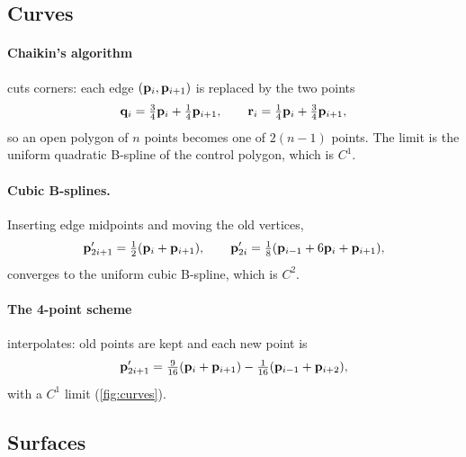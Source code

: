 \subsection{Curves}

\paragraph{Chaikin's algorithm} \citep{Chaikin1974} cuts corners: each edge $(\mathbf{p}_i,\mathbf{p}_{i+1})$ is
replaced by the two points
\begin{equation}
\mathbf{q}_i=\tfrac34\mathbf{p}_i+\tfrac14\mathbf{p}_{i+1},\qquad \mathbf{r}_i=\tfrac14\mathbf{p}_i+\tfrac34\mathbf{p}_{i+1},
\end{equation}
so an open polygon of $n$ points becomes one of $2(n-1)$ points. The limit is the uniform quadratic
B-spline of the control polygon, which is $C^1$.

\paragraph{Cubic B-splines.} Inserting edge midpoints and moving the old vertices,
\begin{equation}
\mathbf{p}'_{2i+1}=\tfrac12(\mathbf{p}_i+\mathbf{p}_{i+1}),\qquad \mathbf{p}'_{2i}=\tfrac18(\mathbf{p}_{i-1}+6\mathbf{p}_i+\mathbf{p}_{i+1}),
\end{equation}
converges to the uniform cubic B-spline, which is $C^2$.

\paragraph{The 4-point scheme} \citep{Dyn1987} interpolates: old points are kept and each new point
is
\begin{equation}
\mathbf{p}'_{2i+1}=\tfrac{9}{16}(\mathbf{p}_i+\mathbf{p}_{i+1})-\tfrac1{16}(\mathbf{p}_{i-1}+\mathbf{p}_{i+2}),
\end{equation}
with a $C^1$ limit (\cref{fig:curves}).


\subsection{Surfaces}

